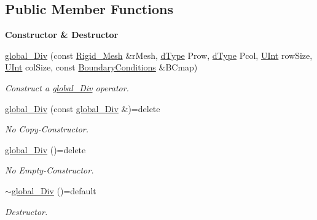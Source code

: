 \subsection*{Public Member Functions}
\begin{Indent}{\bf Constructor \& Destructor}\par
\begin{DoxyCompactItemize}
\item 
\hyperlink{classFVCode3D_1_1global__Div_a3738a7971c5cbf8cc9d77e0dc99a3969}{global\+\_\+\+Div} (const \hyperlink{classFVCode3D_1_1Rigid__Mesh}{Rigid\+\_\+\+Mesh} \&r\+Mesh, \hyperlink{classFVCode3D_1_1global__Operator_a9e94fbe56b84ba80f9e9be56c808e5c3}{d\+Type} Prow, \hyperlink{classFVCode3D_1_1global__Operator_a9e94fbe56b84ba80f9e9be56c808e5c3}{d\+Type} Pcol, \hyperlink{namespaceFVCode3D_a4bf7e328c75d0fd504050d040ebe9eda}{U\+Int} row\+Size, \hyperlink{namespaceFVCode3D_a4bf7e328c75d0fd504050d040ebe9eda}{U\+Int} col\+Size, const \hyperlink{classFVCode3D_1_1BoundaryConditions}{Boundary\+Conditions} \&B\+Cmap)
\begin{DoxyCompactList}\small\item\em Construct a \hyperlink{classFVCode3D_1_1global__Div}{global\+\_\+\+Div} operator. \end{DoxyCompactList}\item 
\hyperlink{classFVCode3D_1_1global__Div_a7c5dd1e2ede1b3433484c98a9bac66c7}{global\+\_\+\+Div} (const \hyperlink{classFVCode3D_1_1global__Div}{global\+\_\+\+Div} \&)=delete
\begin{DoxyCompactList}\small\item\em No Copy-\/\+Constructor. \end{DoxyCompactList}\item 
\hyperlink{classFVCode3D_1_1global__Div_af77b97e03c89839d5e35e7393cd7fa8f}{global\+\_\+\+Div} ()=delete
\begin{DoxyCompactList}\small\item\em No Empty-\/\+Constructor. \end{DoxyCompactList}\item 
\hyperlink{classFVCode3D_1_1global__Div_af311bcd86abcb10511ee6516ff654411}{$\sim$global\+\_\+\+Div} ()=default
\begin{DoxyCompactList}\small\item\em Destructor. \end{DoxyCompactList}\end{DoxyCompactItemize}
\end{Indent}
